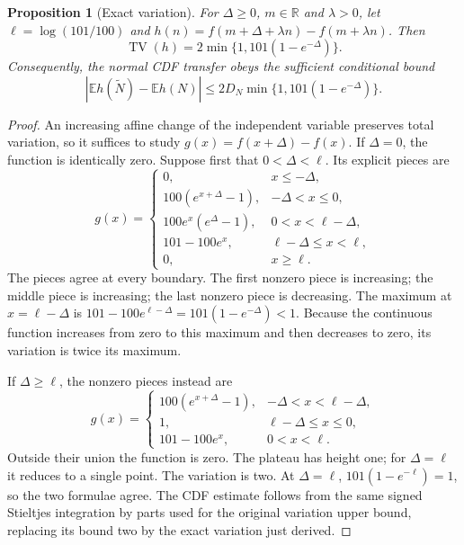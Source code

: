 \documentclass[11pt]{article}
\newtheorem{proposition}[theorem]{Proposition}
\begin{document}
\begin{proposition}[Exact variation]
\label{prop:raw-exact-variation}
For $\Delta\geq0$, $m\in\mathbb R$ and $\lambda>0$, let
$\ell=\log(101/100)$ and
$h(n)=f(m+\Delta+\lambda n)-f(m+\lambda n)$. Then
\begin{equation}
 \operatorname{TV}(h)
 =2\min\{1,101(1-e^{-\Delta})\}.
\end{equation}
Consequently, the normal CDF transfer obeys the sufficient conditional
bound
\begin{equation}
 |\mathbb E h(\widetilde N)-\mathbb E h(N)|
 \leq2D_N\min\{1,101(1-e^{-\Delta})\}.
\end{equation}
\end{proposition}
\begin{proof}
An increasing affine change of the independent variable preserves total
variation, so it suffices to study
$g(x)=f(x+\Delta)-f(x)$. If $\Delta=0$, the function is identically
zero. Suppose first that $0<\Delta<\ell$. Its explicit pieces are
\begin{equation}
 g(x)=\begin{cases}
 0,&x\leq-\Delta,\\
 100(e^{x+\Delta}-1),&-\Delta<x\leq0,\\
 100e^x(e^\Delta-1),&0<x<\ell-\Delta,\\
 101-100e^x,&\ell-\Delta\leq x<\ell,\\
 0,&x\geq\ell.
 \end{cases}
\end{equation}
The pieces agree at every boundary. The first nonzero piece is increasing;
the middle piece is increasing; the last nonzero piece is decreasing.
The maximum at $x=\ell-\Delta$ is
$101-100e^{\ell-\Delta}=101(1-e^{-\Delta})<1$.
Because the continuous function increases from zero to this maximum and
then decreases to zero, its variation is twice its maximum.

If $\Delta\geq\ell$, the nonzero pieces instead are
\begin{equation}
 g(x)=\begin{cases}
 100(e^{x+\Delta}-1),&-\Delta<x<\ell-\Delta,\\
 1,&\ell-\Delta\leq x\leq0,\\
 101-100e^x,&0<x<\ell.
 \end{cases}
\end{equation}
Outside their union the function is zero. The plateau has height one;
for $\Delta=\ell$ it reduces to a single point. The variation is two.
At $\Delta=\ell$, $101(1-e^{-\ell})=1$, so the two formulae agree.
The CDF estimate follows from the same signed Stieltjes integration by
parts used for the original variation upper bound, replacing its bound
two by the exact variation just derived.
\end{proof}
\end{document}
